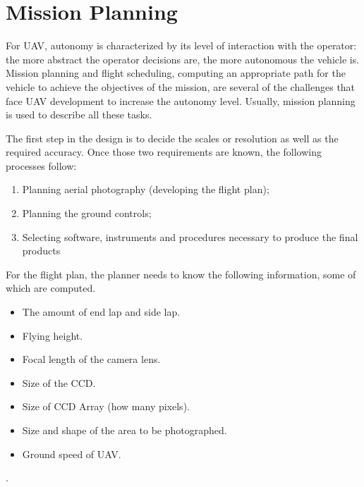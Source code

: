 \section{Mission Planning}
For UAV, autonomy is characterized by its level of interaction with the operator: the more abstract the operator decisions are, the more autonomous the vehicle is. Mission planning and flight scheduling, computing an appropriate path for the vehicle to achieve the objectives of the mission, are several of the challenges that face UAV development to increase the autonomy level. Usually, mission planning is used to describe all these tasks.\cite{4281723}

The first step in the design is to decide the scales or resolution as well as the required accuracy. Once those two requirements are known, the following processes follow:
\begin{enumerate}
\item Planning aerial photography (developing the flight plan);
\item Planning the ground controls;
\item Selecting software, instruments and procedures necessary to produce the final products
\end{enumerate}
For the flight plan, the planner needs to know the following information, some of which are computed.\cite{Design_plann}
\begin{itemize}
\item The amount of end lap and side lap.
\item Flying height.
\item Focal length of the camera lens.
\item Size of the CCD.
\item Size of CCD Array (how many pixels).
\item Size and shape of the area to be photographed.
\item Ground speed of UAV.
\end{itemize}.

